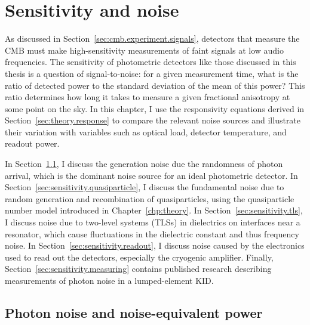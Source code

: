 \chapter{Sensitivity and noise}
\label{chp:sensitivity}

As discussed in Section~\ref{sec:cmb.experiment.signals}, detectors that measure the CMB must make high-sensitivity measurements of faint signals at low audio frequencies.
The sensitivity of photometric detectors like those discussed in this thesis is a question of signal-to-noise: for a given measurement time, what is the ratio of detected power to the standard deviation of the mean of this power?
This ratio determines how long it takes to measure a given fractional anisotropy at some point on the sky.
In this chapter, I use the responsivity equations derived in Section~\ref{sec:theory.response} to compare the relevant noise sources and illustrate their variation with variables such as optical load, detector temperature, and readout power.

In Section~\ref{sec:sensitivity.photon_noise}, I discuss the generation noise due the randomness of photon arrival, which is the dominant noise source for an ideal photometric detector.
In Section~\ref{sec:sensitivity.quasiparticle}, I discuss the fundamental noise due to random generation and recombination of quasiparticles, using the quasiparticle number model introduced in Chapter~\ref{chp:theory}.
In Section~\ref{sec:sensitivity.tls}, I discuss noise due to two-level systems (TLSs) in dielectrics on interfaces near a resonator, which cause fluctuations in the dielectric constant and thus frequency noise.
In Section~\ref{sec:sensitivity.readout}, I discuss noise caused by the electronics used to read out the detectors, especially the cryogenic amplifier.
Finally, Section~\ref{sec:sensitivity.measuring} contains published research describing measurements of photon noise in a lumped-element KID.


\section{Photon noise and noise-equivalent power}
\label{sec:sensitivity.photon_noise}

